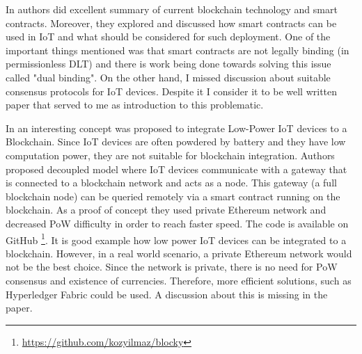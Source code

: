 In \cite{christidis_blockchains_2016} authors did excellent summary of current blockchain technology and smart contracts. Moreover, they explored and discussed how smart contracts can be used in IoT and what should be considered for such deployment. One of the important things mentioned was that smart contracts are not legally binding (in permissionless DLT) and there is work being done towards solving this issue called "dual binding". On the other hand, I missed discussion about suitable consensus protocols for IoT devices. Despite it I consider it to be well written paper that served to me as introduction to this problematic.

In \cite{ozyilmaz_integrating_2017} an interesting concept was proposed to integrate Low-Power IoT devices to a Blockchain. Since IoT devices are often powdered by battery and they have low computation power, they are not suitable for blockchain integration. Authors proposed decoupled model where IoT devices communicate with a gateway that is connected to a blockchain network and acts as a node. This gateway (a full blockchain node) can be queried remotely via a smart contract running on the blockchain. As a proof of concept they used private Ethereum network and decreased PoW difficulty in order to reach faster speed. The code is available on GitHub \footnote{\url{https://github.com/kozyilmaz/blocky}}. It is good example how low power IoT devices can be integrated to a blockchain. However, in a real world scenario, a private Ethereum network would not be the best choice. Since the network is private, there is no need for PoW consensus and existence of currencies. Therefore, more efficient solutions, such as Hyperledger Fabric \cite{vukolic_rethinking_2017} could be used. A discussion about this is missing in the paper.

